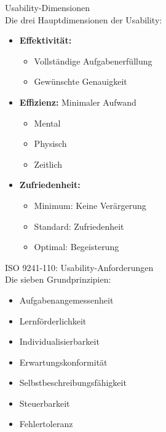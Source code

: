\begin{definition}{Usability-Dimensionen}\\
Die drei Hauptdimensionen der Usability:
\begin{itemize}
    \item \textbf{Effektivität:}
    \begin{itemize}
        \item Vollständige Aufgabenerfüllung
        \item Gewünschte Genauigkeit
    \end{itemize}
    \item \textbf{Effizienz:} Minimaler Aufwand
    \begin{itemize}
        \item Mental
        \item Physisch
        \item Zeitlich
    \end{itemize}
    \item \textbf{Zufriedenheit:}
    \begin{itemize}
        \item Minimum: Keine Verärgerung
        \item Standard: Zufriedenheit
        \item Optimal: Begeisterung
    \end{itemize}
\end{itemize}
\end{definition}

\begin{theorem}{ISO 9241-110: Usability-Anforderungen}\\
Die sieben Grundprinzipien:
\begin{itemize}
    \item Aufgabenangemessenheit
    \item Lernförderlichkeit
    \item Individualisierbarkeit
    \item Erwartungskonformität
    \item Selbstbeschreibungsfähigkeit
    \item Steuerbarkeit
    \item Fehlertoleranz
\end{itemize}
\end{theorem}

